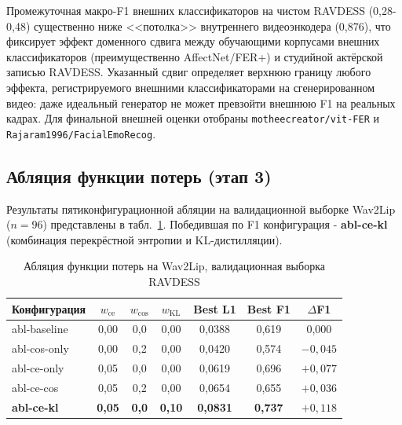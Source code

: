 \documentclass[a4paper, 12pt, oneside, openany]{article}
\begin{document}
Промежуточная макро-F1 внешних классификаторов на чистом RAVDESS (0,28-0,48) существенно ниже <<потолка>> внутреннего видеоэнкодера (0,876), что фиксирует эффект доменного сдвига между обучающими корпусами внешних классификаторов (преимущественно AffectNet/FER+) и студийной актёрской записью RAVDESS. Указанный сдвиг определяет верхнюю границу любого эффекта, регистрируемого внешними классификаторами на сгенерированном видео: даже идеальный генератор не может превзойти внешнюю F1 на реальных кадрах. Для финальной внешней оценки отобраны \texttt{motheecreator/vit-FER} и \texttt{Rajaram1996/FacialEmoRecog}.

\subsection{Абляция функции потерь (этап 3)}

Результаты пятиконфигурационной абляции на валидационной выборке Wav2Lip ($n=96$) представлены в табл.~\ref{tab:ablation}. Победившая по F1 конфигурация - \textbf{abl-ce-kl} (комбинация перекрёстной энтропии и KL-дистилляции).

\begin{table}[H]
\caption{Абляция функции потерь на Wav2Lip, валидационная выборка RAVDESS}
\label{tab:ablation}
\centering
\small
\begin{tabular}{|p{2.5cm}|c|c|c|c|c|c|}
\hline
\textbf{Конфигурация} & $w_{\text{ce}}$ & $w_{\cos}$ & $w_{\text{KL}}$ & \textbf{Best L1} & \textbf{Best F1} & $\Delta$F1 \\
\hline
abl-baseline & 0,00 & 0,0 & 0,00 & 0,0388 & 0,619 & 0,000 \\
\hline
abl-cos-only & 0,00 & 0,2 & 0,00 & 0,0420 & 0,574 & $-0,045$ \\
\hline
abl-ce-only & 0,05 & 0,0 & 0,00 & 0,0619 & 0,696 & $+0,077$ \\
\hline
abl-ce-cos & 0,05 & 0,2 & 0,00 & 0,0654 & 0,655 & $+0,036$ \\
\hline
\textbf{abl-ce-kl} & \textbf{0,05} & \textbf{0,0} & \textbf{0,10} & \textbf{0,0831} & \textbf{0,737} & \textbf{$+0,118$} \\
\hline
\end{tabular}
\end{table}
\end{document}
